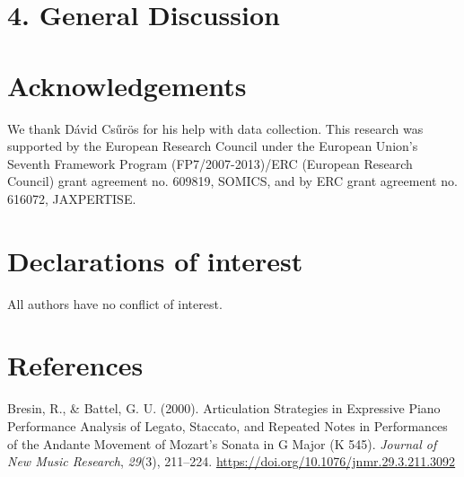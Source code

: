 \documentclass[
  english,
  man,floatsintext]{apa6}
\newlength{\cslhangindent}
\newenvironment{cslreferences}%
  {\setlength{\parindent}{0pt}%
  \everypar{\setlength{\hangindent}{\cslhangindent}}\ignorespaces}%
  {\par}
\begin{document}
\newpage

\hypertarget{general-discussion}{%
\section{4. General Discussion}\label{general-discussion}}

\hypertarget{acknowledgements}{%
\section{Acknowledgements}\label{acknowledgements}}

We thank Dávid Csűrös for his help with data collection. This research was supported by the European Research Council under the European Union's Seventh Framework Program (FP7/2007-2013)/ERC (European Research Council) grant agreement no. 609819, SOMICS, and by ERC grant agreement no. 616072, JAXPERTISE.

\hypertarget{declarations-of-interest}{%
\section{Declarations of interest}\label{declarations-of-interest}}

All authors have no conflict of interest.

\newpage

\hypertarget{references}{%
\section{References}\label{references}}

\begingroup
\setlength{\parindent}{-0.5in}
\setlength{\leftskip}{0.5in}

\hypertarget{refs}{}
\begin{cslreferences}
\leavevmode\hypertarget{ref-bresin_2000}{}%
Bresin, R., \& Battel, G. U. (2000). Articulation Strategies in Expressive Piano Performance Analysis of Legato, Staccato, and Repeated Notes in Performances of the Andante Movement of Mozart's Sonata in G Major (K 545). \emph{Journal of New Music Research}, \emph{29}(3), 211--224. \url{https://doi.org/10.1076/jnmr.29.3.211.3092}
\end{cslreferences}

\endgroup
\raggedbottom
\end{document}
